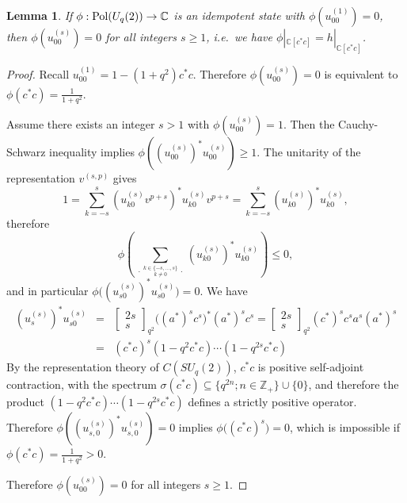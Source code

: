 \documentclass[12pt]{amsart}
\newtheorem{lemma}[theorem]{Lemma}
\theoremstyle{definition}
\theoremstyle{remark}
\numberwithin{equation}{section}
\begin{document}
\begin{lemma}\label{lem-haar1}
If $\phi:{\rm Pol}(U_q(2))\to\mathbb{C}$ is an idempotent state with
$\phi(u^{(1)}_{00})=0$, then $\phi(u^{(s)}_{00})=0$ for all integers $s\ge 1$,
i.e.\ we have $\phi|_{\mathbb{C}[c^*c]}=h|_{\mathbb{C}[c^*c]}$.
\end{lemma}
\begin{proof}
Recall $u^{(1)}_{00}=1-(1+q^2) c^*c$. Therefore $\phi(u^{(s)}_{00})=0$ is equivalent to $\phi(c^*c)=\frac{1}{1+q^2}$.

Assume there exists an integer $s > 1$ with $\phi(u^{(s)}_{00})=1$. Then the Cauchy-Schwarz
inequality implies $\phi((u^{(s)}_{00})^*u^{(s)}_{00})\ge 1$. The unitarity of the representation
$v^{(s,p)}$ gives
\[
1=\sum_{k=-s}^s \left(u^{(s)}_{k0}v^{p+s}\right)^*u^{(s)}_{k0}v^{p+s} = \sum_{k=-s}^s \left(u^{(s)}_{k0}\right)^*u^{(s)}_{k0},
\]
therefore
\[
\phi\left(\sum_{\genfrac{.}{.}{0pt}{}{k\in\{-s,\ldots,s\}}{k\not=0}}\left(u^{(s)}_{k0}\right)^*u^{(s)}_{k0}\right)
\le 0,
\]
and in particular $\phi\big((u^{(s)}_{s0})^*u^{(s)}_{s0}\big)=0$.
We have
\begin{eqnarray*}
\left(u^{(s)}_{s}\right)^*u^{(s)}_{s0} &=& \left[\begin{array}{c} 2s \\ s
  \end{array}\right]_{q^2}\big((a^*)^sc^s\big)^*(a^*)^sc^s = \left[\begin{array}{c} 2s \\ s
  \end{array}\right]_{q^2}(c^*)^sc^sa^s(a^*)^s \\
&=&(c^*c)^s (1-q^2c^*c)\cdots (1-q^{2s}c^*c)
\end{eqnarray*}
By the representation theory of $C(SU_q(2))$, $c^*c$ is positive self-adjoint
contraction, with the spectrum $\sigma(c^*c)\subseteq\{q^{2n};n\in\mathbb{Z}_+\}\cup\{0\}$, and therefore the
product $(1-q^2c^*c)\cdots (1-q^{2s}c^*c)$ defines a strictly
positive operator. Therefore
$\phi\left((u^{(s)}_{s,0})^*u^{(s)}_{s,0}\right) = 0$ implies
$\phi\big((c^*c)^s\big)=0$, which is impossible if $\phi(c^*c)=\frac{1}{1+q^2}>0$.

Therefore $\phi(u^{(s)}_{00})=0$ for all
integers $s\ge 1$.
\end{proof}
\end{document}
